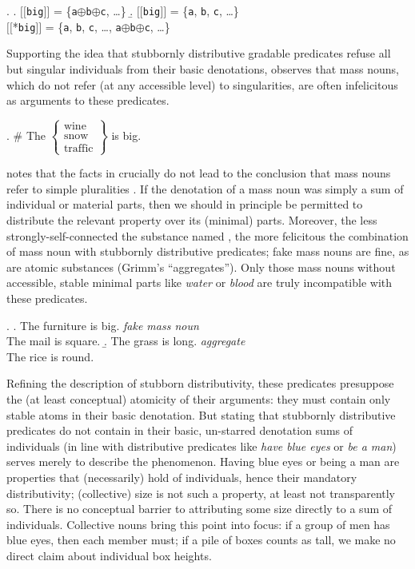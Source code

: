 \documentclass[linguex]{sp}
\newcommand{\sem}[1]{\mbox{$[\![$#1$]\!]$}}
\renewcommand{\tt}{\texttt}
\newcommand{\op}{$\oplus$}
\begin{document}
\ex. \a. \sem{\tt{big}} = \{\tt{a}\op\tt{b}\op\tt{c}, \ldots\}
\b. \sem{\tt{big}} = \{\tt{a}, \tt{b}, \tt{c}, \ldots\}\\
\sem{*\tt{big}} = \{\tt{a}, \tt{b}, \tt{c}, \ldots, \tt{a}\op\tt{b}\op\tt{c}, \ldots\}

Supporting the idea that stubbornly distributive gradable predicates refuse all but singular individuals from their basic denotations, \cite{schwarzschild2011} observes that mass nouns, which do not refer (at any accessible level) to singularities, are often infelicitous as arguments to these predicates.

\ex. \# The $\left\{\begin{array}{l}\text{wine}\\ \text{snow}\\ \text{traffic}\end{array}\right\}$ is big.

\citeauthor{schwarzschild2011} notes that  the facts in \Last crucially do not lead to the conclusion that mass nouns refer to simple pluralities \citep[cf., e.g.,][]{chierchia1998mass}. If the denotation of a mass noun was simply a sum of individual or material parts, then we should in principle be permitted to distribute the relevant property over its (minimal) parts. Moreover, the less strongly-self-connected the substance named  \citep[in the sense of][]{grimm2012}, the more felicitous the combination of mass noun with stubbornly distributive predicates; fake mass nouns are fine, as are atomic substances (Grimm's ``aggregates''). Only those mass nouns without accessible, stable minimal parts like \emph{water} or \emph{blood} are truly incompatible with these predicates.

\ex. \a. The furniture is big. \hfill \emph{fake mass noun}\\
The mail is square.
\b. The grass is long. \hfill \emph{aggregate}\\
The rice is round.

Refining the description of stubborn distributivity, these predicates presuppose the (at least conceptual) atomicity of their arguments: they must contain only stable atoms in their basic denotation. But stating that stubbornly distributive predicates do not contain in their basic, un-starred denotation sums of individuals (in line with distributive predicates like \emph{have blue eyes} or \emph{be a man}) serves merely to describe the phenomenon. Having blue eyes or being a man are properties that (necessarily) hold of individuals, hence their mandatory distributivity; (collective) size is not such a property, at least not transparently so. There is no conceptual barrier to attributing some size directly to a sum of individuals. Collective nouns bring this point into focus: if a group of men has blue eyes, then each member must; if a pile of boxes counts as tall, we make no direct claim about individual box heights.
\end{document}
